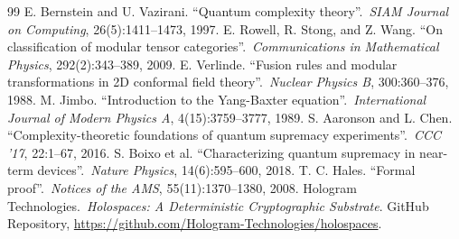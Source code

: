 \begin{thebibliography}{99}
 E. Bernstein and U. Vazirani. ``Quantum complexity theory''.\ \textit{SIAM Journal on Computing}, 26(5):1411--1473, 1997.
 E. Rowell, R. Stong, and Z. Wang. ``On classification of modular tensor categories''.\ \textit{Communications in Mathematical Physics}, 292(2):343--389, 2009.
 E. Verlinde. ``Fusion rules and modular transformations in 2D conformal field theory''.\ \textit{Nuclear Physics B}, 300:360--376, 1988.
 M. Jimbo. ``Introduction to the Yang-Baxter equation''.\ \textit{International Journal of Modern Physics A}, 4(15):3759--3777, 1989.
 S. Aaronson and L. Chen. ``Complexity-theoretic foundations of quantum supremacy experiments''.\ \textit{CCC '17}, 22:1--67, 2016.
 S. Boixo et al. ``Characterizing quantum supremacy in near-term devices''.\ \textit{Nature Physics}, 14(6):595--600, 2018.
 T. C. Hales. ``Formal proof''.\ \textit{Notices of the AMS}, 55(11):1370--1380, 2008.
 Hologram Technologies.\ \textit{Holospaces: A Deterministic Cryptographic Substrate}. GitHub Repository, \url{https://github.com/Hologram-Technologies/holospaces}.
\end{thebibliography}

